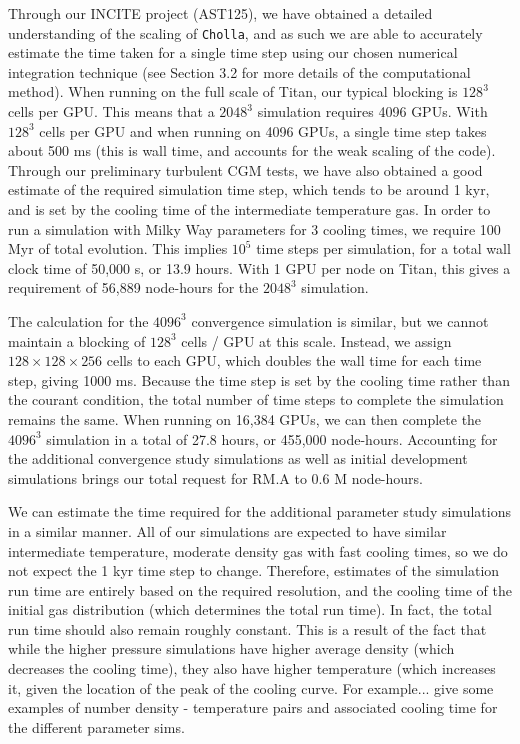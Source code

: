 \documentclass[11pt,letterpaper,english]{article}
\begin{document}
Through our INCITE project (AST125), we have obtained a detailed understanding of the scaling of {\tt Cholla}, and as such we are able to accurately estimate the time taken for a single time step using our chosen numerical integration technique (see Section 3.2 for more details of the computational method). When running on the full scale of Titan, our typical blocking is $128^3$ cells per GPU. This means that a $2048^3$ simulation requires 4096 GPUs. With $128^3$ cells per GPU and when running on 4096 GPUs, a single time step takes about 500 ms (this is wall time, and accounts for the weak scaling of the code). Through our preliminary turbulent CGM tests, we have also obtained a good estimate of the required simulation time step, which tends to be around 1 kyr, and is set by the cooling time of the intermediate temperature gas. In order to run a simulation with Milky Way parameters for 3 cooling times, we require 100 Myr of total evolution. This implies $10^5$ time steps per simulation, for a total wall clock time of 50,000 s, or 13.9 hours. With 1 GPU per node on Titan, this gives a requirement of 56,889 node-hours for the $2048^3$ simulation.

The calculation for the $4096^3$ convergence simulation is similar, but we cannot maintain a blocking of $128^3$ cells / GPU at this scale. Instead, we assign $128\times128\times256$ cells to each GPU, which doubles the wall time for each time step, giving 1000 ms. Because the time step is set by the cooling time rather than the courant condition, the total number of time steps to complete the simulation remains the same. When running on 16,384 GPUs, we can then complete the $4096^3$ simulation in a total of 27.8 hours, or 455,000 node-hours. Accounting for the additional convergence study simulations as well as initial development simulations brings our total request for RM.A to 0.6 M node-hours.

We can estimate the time required for the additional parameter study simulations in a similar manner. All of our simulations are expected to have similar intermediate temperature, moderate density gas with fast cooling times, so we do not expect the 1 kyr time step to change. Therefore, estimates of the simulation run time are entirely based on the required resolution, and the cooling time of the initial gas distribution (which determines the total run time). In fact, the total run time should also remain roughly constant. This is a result of the fact that while the higher pressure simulations have higher average density (which decreases the cooling time), they also have higher temperature (which increases it, given the location of the peak of the cooling curve. For example... give some examples of number density - temperature pairs and associated cooling time for the different parameter sims.
\end{document}
